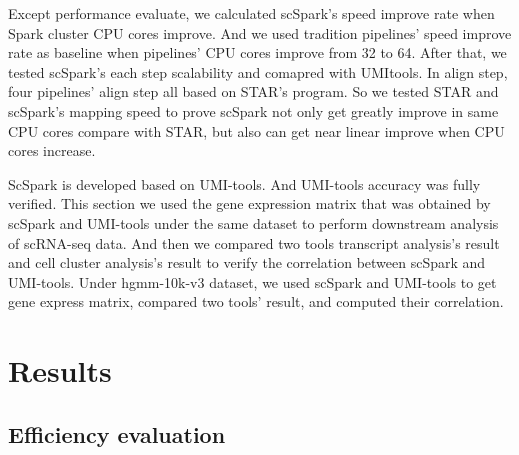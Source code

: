 \documentclass[conference]{IEEEtran}
\begin{document}
Except performance evaluate, we calculated scSpark's speed improve rate when Spark cluster CPU cores improve.
And we used tradition pipelines' speed improve rate as baseline when pipelines' CPU cores improve from 32 to 64.
After that, we tested scSpark's each step scalability and comapred with UMI\-tools.
In align step, four pipelines' align step all based on STAR's program.
So we tested STAR and scSpark's mapping speed to prove scSpark not only get greatly improve in same CPU cores compare with STAR, but also can get near linear improve when CPU cores increase.

ScSpark is developed based on UMI-tools. 
And UMI-tools accuracy was fully verified. 
This section we used the gene expression matrix that was obtained by scSpark and UMI-tools under the same dataset to perform downstream analysis of scRNA-seq data. 
And then we compared two tools transcript analysis's result and cell cluster analysis's result to verify the correlation between scSpark and UMI-tools. 
Under hgmm-10k-v3 dataset, we used scSpark and UMI-tools to get gene express matrix, compared two tools' result, and computed their correlation.

\section{Results}

\subsection{Efficiency evaluation}
\end{document}

